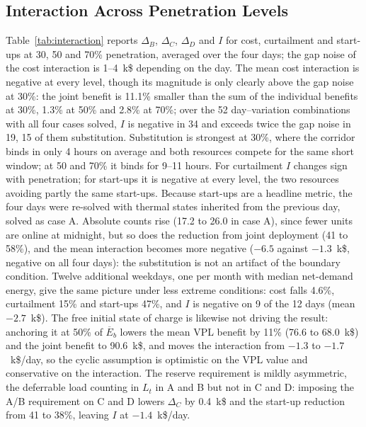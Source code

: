 \documentclass[conference]{IEEEtran}
\begin{document}
\subsection{Interaction Across Penetration Levels}
Table~\ref{tab:interaction} reports $\Delta_B$, $\Delta_C$, $\Delta_D$ and $I$ for cost, curtailment and start-ups at 30, 50 and 70\% penetration, averaged over the four days; the gap noise of the cost interaction is 1--4~k\$ depending on the day. The mean cost interaction is negative at every level, though its magnitude is only clearly above the gap noise at 30\%: the joint benefit is 11.1\% smaller than the sum of the individual benefits at 30\%, 1.3\% at 50\% and 2.8\% at 70\%; over the 52 day--variation combinations with all four cases solved, $I$ is negative in 34 and exceeds twice the gap noise in 19, 15 of them substitution. Substitution is strongest at 30\%, where the corridor binds in only 4 hours on average and both resources compete for the same short window; at 50 and 70\% it binds for 9--11 hours. For curtailment $I$ changes sign with penetration; for start-ups it is negative at every level, the two resources avoiding partly the same start-ups. Because start-ups are a headline metric, the four days were re-solved with thermal states inherited from the previous day, solved as case A. Absolute counts rise (17.2 to 26.0 in case A), since fewer units are online at midnight, but so does the reduction from joint deployment (41 to 58\%), and the mean interaction becomes more negative ($-6.5$ against $-1.3$~k\$, negative on all four days): the substitution is not an artifact of the boundary condition. Twelve additional weekdays, one per month with median net-demand energy, give the same picture under less extreme conditions: cost falls 4.6\%, curtailment 15\% and start-ups 47\%, and $I$ is negative on 9 of the 12 days (mean $-2.7$~k\$). The free initial state of charge is likewise not driving the result: anchoring it at 50\% of $\overline{E}_b$ lowers the mean VPL benefit by 11\% (76.6 to 68.0~k\$) and the joint benefit to 90.6~k\$, and moves the interaction from $-1.3$ to $-1.7$~k\$/day, so the cyclic assumption is optimistic on the VPL value and conservative on the interaction. The reserve requirement is mildly asymmetric, the deferrable load counting in $L_t$ in A and B but not in C and D: imposing the A/B requirement on C and D lowers $\Delta_C$ by 0.4~k\$ and the start-up reduction from 41 to 38\%, leaving $I$ at $-1.4$~k\$/day.
\end{document}
